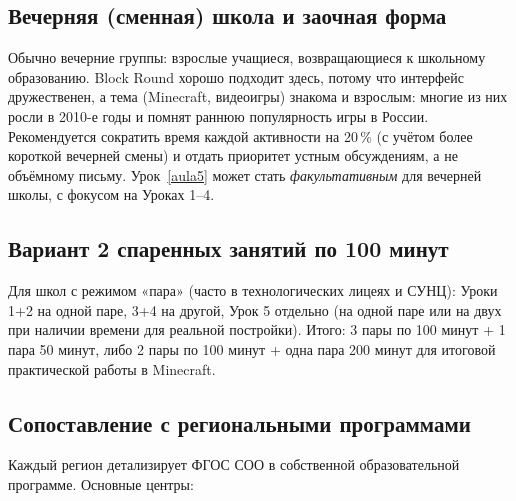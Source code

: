 \documentclass[12pt,a4paper]{scrartcl}
\begin{document}
\subsection{Вечерняя (сменная) школа и заочная форма}
Обычно вечерние группы: взрослые учащиеся, возвращающиеся к школьному образованию. Block Round хорошо подходит здесь, потому что интерфейс дружественен, а тема (Minecraft, видеоигры) знакома и взрослым: многие из них росли в 2010-е годы и помнят раннюю популярность игры в России. Рекомендуется сократить время каждой активности на 20\,\% (с учётом более короткой вечерней смены) и отдать приоритет устным обсуждениям, а не объёмному письму. Урок~\ref{aula5} может стать \emph{факультативным} для вечерней школы, с фокусом на Уроках 1--4.

\subsection{Вариант 2 спаренных занятий по 100 минут}
Для школ с режимом «пара» (часто в технологических лицеях и СУНЦ): Уроки 1+2 на одной паре, 3+4 на другой, Урок 5 отдельно (на одной паре или на двух при наличии времени для реальной постройки). Итого: 3 пары по 100 минут + 1 пара 50 минут, либо 2 пары по 100 минут + одна пара 200 минут для итоговой практической работы в Minecraft.

\subsection{Сопоставление с региональными программами}

Каждый регион детализирует ФГОС СОО в собственной образовательной программе. Основные центры:
\end{document}
